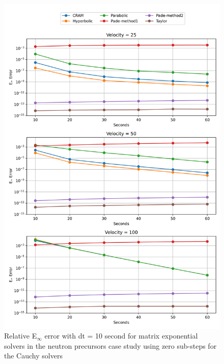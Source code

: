 \begin{figure}[p]
    \centering
    \includegraphics[width=5in]{images/chapter-5/caseStudies/neutronPrecursors/dt10/neutronPrecursorsEinfErrorerrorSteps0.png}
    \caption{Relative E$_{\infty}$ error with dt = 10 second for matrix exponential solvers in the neutron precursors case study using zero sub-steps for the Cauchy solvers}
    \label{fig:neutron_precursors_Einf_dt10_steps0}
\end{figure}

\clearpage

